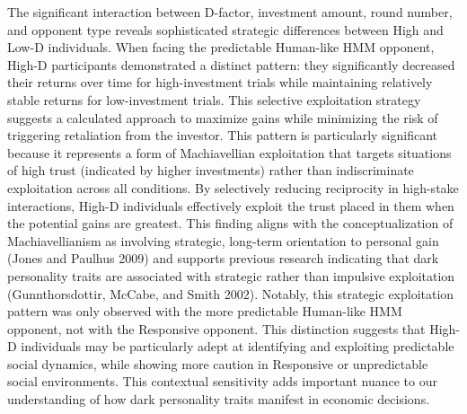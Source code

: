 \documentclass[
]{article}
\begin{document}
The significant interaction between D-factor, investment amount, round number, and opponent type reveals sophisticated strategic differences between High and Low-D individuals. When facing the predictable Human-like HMM opponent, High-D participants demonstrated a distinct pattern: they significantly decreased their returns over time for high-investment trials while maintaining relatively stable returns for low-investment trials. This selective exploitation strategy suggests a calculated approach to maximize gains while minimizing the risk of triggering retaliation from the investor.
This pattern is particularly significant because it represents a form of Machiavellian exploitation that targets situations of high trust (indicated by higher investments) rather than indiscriminate exploitation across all conditions. By selectively reducing reciprocity in high-stake interactions, High-D individuals effectively exploit the trust placed in them when the potential gains are greatest. This finding aligns with the conceptualization of Machiavellianism as involving strategic, long-term orientation to personal gain (Jones and Paulhus 2009) and supports previous research indicating that dark personality traits are associated with strategic rather than impulsive exploitation (Gunnthorsdottir, McCabe, and Smith 2002).
Notably, this strategic exploitation pattern was only observed with the more predictable Human-like HMM opponent, not with the Responsive opponent. This distinction suggests that High-D individuals may be particularly adept at identifying and exploiting predictable social dynamics, while showing more caution in Responsive or unpredictable social environments. This contextual sensitivity adds important nuance to our understanding of how dark personality traits manifest in economic decisions.
\end{document}
